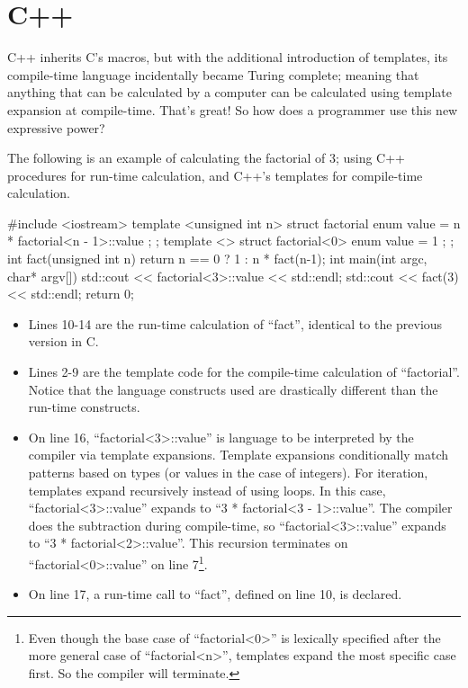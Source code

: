  \section{C++}

 C++ inherits C's macros, but with the additional introduction
 of templates, its compile-time language
 incidentally became Turing complete;  meaning that
 anything that can be
 calculated by a computer can be calculated using template expansion
 at compile-time.  That's great!  So how does a programmer use this new
 expressive power?

 The following is an example of calculating the factorial of
 3; using C++ procedures for run-time calculation, and C++'s templates for compile-time
 calculation.

 \begin{code}
 #include <iostream>
 template <unsigned int n>
 struct factorial {
     enum { value = n * factorial<n - 1>::value };
 };
 template <>
 struct factorial<0> {
     enum { value = 1 };
 };
 int fact(unsigned int n){
   return n == 0
     ? 1
     : n * fact(n-1);
 }
 int main(int argc, char* argv[]){
   std::cout << factorial<3>::value << std::endl;
   std::cout << fact(3) << std::endl;
   return 0;
 }
 \end{code}

 \begin{itemize}
  \item
    Lines 10-14 are the run-time calculation of ``fact'', identical
    to the previous version in C.
  \item
   Lines 2-9 are the
   template code for the compile-time calculation of ``factorial''.  Notice
    that the language constructs used are drastically different than the
    run-time constructs.
   \item
 On line 16, ``factorial\textless3\textgreater::value'' is
 language to be interpreted
 by the compiler via template expansions.  Template expansions
 conditionally match patterns based on types (or values in the case
 of integers).  For iteration, templates expand recursively instead of using loops.
 In this case,  ``factorial\textless3\textgreater::value'' expands to
 ``3 * factorial\textless3 - 1\textgreater::value''.  The compiler
 does the subtraction during compile-time,
 so ``factorial\textless3\textgreater::value'' expands to
 ``3 * factorial\textless2\textgreater::value''.
 This recursion terminates on ``factorial\textless0\textgreater::value''
 on line 7\footnote{Even though
 the base case of ``factorial\textless0\textgreater'' is lexically specified
 after the more general
 case of ``factorial\textless n\textgreater'', templates expand the most
 specific case first.  So the compiler will terminate.}.

   \item
 On line 17, a run-time call to ``fact'', defined on line 10, is declared.
 \end{itemize}

